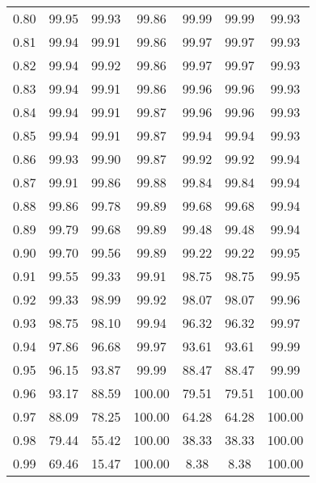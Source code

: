 \begin{tabular}{|c|c|c|c|c|c|c|}
      0.80 &     99.95 &     99.93 &      99.86 &   99.99 &      99.99 &         99.93 \\
      0.81 &     99.94 &     99.91 &      99.86 &   99.97 &      99.97 &         99.93 \\
      0.82 &     99.94 &     99.92 &      99.86 &   99.97 &      99.97 &         99.93 \\
      0.83 &     99.94 &     99.91 &      99.86 &   99.96 &      99.96 &         99.93 \\
      0.84 &     99.94 &     99.91 &      99.87 &   99.96 &      99.96 &         99.93 \\
      0.85 &     99.94 &     99.91 &      99.87 &   99.94 &      99.94 &         99.93 \\
      0.86 &     99.93 &     99.90 &      99.87 &   99.92 &      99.92 &         99.94 \\
      0.87 &     99.91 &     99.86 &      99.88 &   99.84 &      99.84 &         99.94 \\
      0.88 &     99.86 &     99.78 &      99.89 &   99.68 &      99.68 &         99.94 \\
      0.89 &     99.79 &     99.68 &      99.89 &   99.48 &      99.48 &         99.94 \\
      0.90 &     99.70 &     99.56 &      99.89 &   99.22 &      99.22 &         99.95 \\
      0.91 &     99.55 &     99.33 &      99.91 &   98.75 &      98.75 &         99.95 \\
      0.92 &     99.33 &     98.99 &      99.92 &   98.07 &      98.07 &         99.96 \\
      0.93 &     98.75 &     98.10 &      99.94 &   96.32 &      96.32 &         99.97 \\
      0.94 &     97.86 &     96.68 &      99.97 &   93.61 &      93.61 &         99.99 \\
      0.95 &     96.15 &     93.87 &      99.99 &   88.47 &      88.47 &         99.99 \\
      0.96 &     93.17 &     88.59 &     100.00 &   79.51 &      79.51 &        100.00 \\
      0.97 &     88.09 &     78.25 &     100.00 &   64.28 &      64.28 &        100.00 \\
      0.98 &     79.44 &     55.42 &     100.00 &   38.33 &      38.33 &        100.00 \\
      0.99 &     69.46 &     15.47 &     100.00 &    8.38 &       8.38 &        100.00 \\
\bottomrule
\end{tabular}
